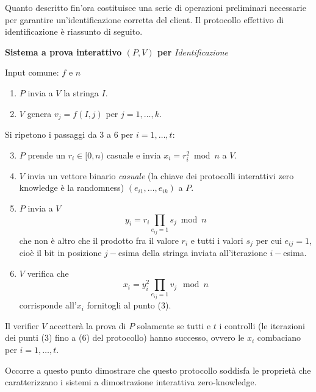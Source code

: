 \documentclass{article}
\theoremstyle{definition}
\begin{document}
Quanto descritto fin'ora costituisce una serie di operazioni preliminari necessarie per garantire un'identificazione corretta del client.
Il protocollo effettivo di identificazione è riassunto di seguito.

\begin{mdframed}
\begin{center}
    \vspace{10pt}
    \textbf{Sistema a prova interattivo $(P, V)$ per} \textit{Identificazione}
    \vspace{10pt}
\end{center} 
Input comune: $f$ e $n$
\begin{enumerate}
    \item $P$ invia a $V$ la stringa $I$. 
    \item $V$ genera $v_j = f(I, j)$ per $j = 1, \dots, k$.  
\end{enumerate}
Si ripetono i passaggi da 3 a 6 per $i = 1, \dots, t$:
\begin{enumerate}
    \setcounter{enumi}{2}
    \item $P$ prende un $r_i \in [0, n)$ casuale e invia $x_i = r_i^2 \bmod n$ a $V$.
    \item $V$ invia un vettore binario \emph{casuale} (la chiave dei protocolli interattivi zero knowledge è la randomness) $(e_{i1}, \dots, e_{ik})$ a $P$.
    \item $P$ invia a $V$ 
    \begin{equation}\label{eq:fiat_shamir_yi}
        y_i = r_i \prod_{e_{ij}=1} s_j \bmod n
    \end{equation}
    che non è altro che il prodotto fra il valore $r_i$ e tutti i valori $s_j$ per cui $e_{ij} = 1$, cioè il bit in posizione $j-$esima della stringa inviata all'iterazione $i-$esima.
    \item $V$ verifica che 
    \begin{equation}\label{eq:fiat_shamir_verifica}
        x_i = y_i^2 \prod_{e_{ij} = 1} v_j \mod n
    \end{equation}
    corrisponde all'$x_i$ fornitogli al punto (3).
\end{enumerate}
\end{mdframed}

Il verifier $V$ accetterà la prova di $P$ solamente se tutti e $t$ i controlli (le iterazioni dei punti (3) fino a (6) del protocollo) hanno successo, ovvero le $x_i$ combaciano per $i = 1, \dots, t$.

Occorre a questo punto dimostrare che questo protocollo soddisfa le proprietà che caratterizzano i sistemi a dimostrazione interattiva zero-knowledge.
\end{document}
